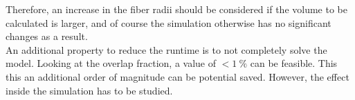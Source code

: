 Therefore, an increase in the fiber radii should be considered if the volume to be calculated is larger, and of course the simulation otherwise has no significant changes as a result.
\\
% 
An additional property to reduce the runtime is to not completely solve the model. 
Looking at the overlap fraction, a value of $<\SI{1}{\percent}$ can be feasible.
This this an additional order of magnitude can be potential saved.
However, the effect inside the simulation has to be studied.
% 
% 
% 
% 

